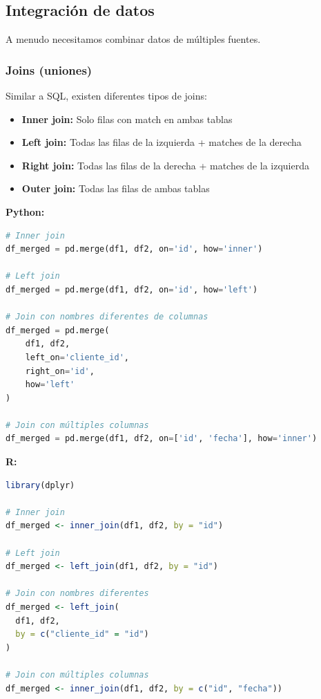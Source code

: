 \documentclass[a4paper,11pt]{article}
\begin{document}
\subsection{Integración de datos}

A menudo necesitamos combinar datos de múltiples fuentes.

\subsubsection{Joins (uniones)}

Similar a SQL, existen diferentes tipos de joins:

\begin{itemize}
    \item \textbf{Inner join:} Solo filas con match en ambas tablas
    \item \textbf{Left join:} Todas las filas de la izquierda + matches de la derecha
    \item \textbf{Right join:} Todas las filas de la derecha + matches de la izquierda
    \item \textbf{Outer join:} Todas las filas de ambas tablas
\end{itemize}

\textbf{Python:}
\begin{lstlisting}[language=Python]
# Inner join
df_merged = pd.merge(df1, df2, on='id', how='inner')

# Left join
df_merged = pd.merge(df1, df2, on='id', how='left')

# Join con nombres diferentes de columnas
df_merged = pd.merge(
    df1, df2,
    left_on='cliente_id',
    right_on='id',
    how='left'
)

# Join con múltiples columnas
df_merged = pd.merge(df1, df2, on=['id', 'fecha'], how='inner')
\end{lstlisting}

\textbf{R:}
\begin{lstlisting}[language=R]
library(dplyr)

# Inner join
df_merged <- inner_join(df1, df2, by = "id")

# Left join
df_merged <- left_join(df1, df2, by = "id")

# Join con nombres diferentes
df_merged <- left_join(
  df1, df2,
  by = c("cliente_id" = "id")
)

# Join con múltiples columnas
df_merged <- inner_join(df1, df2, by = c("id", "fecha"))
\end{lstlisting}
\end{document}
